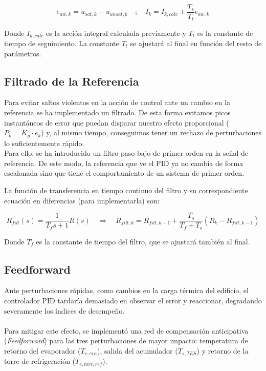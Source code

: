 	
	\begin{equation}
		e_{aw,k} = u_{sat,k} - u_{unsat,k} \quad ; \quad I_{k} = I_{k,calc} + \frac{T_s}{T_t} e_{aw,k}
	\end{equation}
	
	Donde $I_{k,calc}$ es la acción integral calculada previamente y $T_t$ es la constante de tiempo de seguimiento.  La constante $T_t$ se ajustará al final en función del resto de parámetros. 
	
	\subsection{Filtrado de la Referencia}
	
	Para evitar saltos violentos en la acción de control ante un cambio en la referencia se ha implementado un filtrado. De esta forma evitamos picos instantáneos de error que puedan disparar nuestro efecto proporcional ($P_k = K_p \cdot e_k$) y, al mismo tiempo, conseguimos tener un rechazo de perturbaciones lo suficientemente rápido. \\
	
Para ello, se ha introducido un filtro paso-bajo de primer orden en la señal de referencia. De este modo, la referencia que ve el PID ya no cambia de forma escalonada sino que tiene el comportamiento de un sistema de primer orden.  
	
	La función de transferencia en tiempo continuo del filtro y su correspondiente ecuación en diferencias (para implementarla) son:
	
	\begin{equation}
		R_{filt}(s) = \frac{1}{T_f s + 1} R(s) \quad \Longrightarrow \quad R_{filt,k} = R_{filt,k-1} + \frac{T_s}{T_f + T_s} \left( R_k - R_{filt,k-1} \right)
	\end{equation}
	
	Donde $T_f$ es la constante de tiempo del filtro, que se ajustará también al final.  
	
	\subsection{Feedforward}
	
	Ante perturbaciones rápidas, como cambios en la carga térmica del edificio, el controlador PID tardaría demasiado en observar el error y reaccionar, degradando severamente los índices de desempeño.\\\\
	 Para mitigar este efecto, se implementó una red de compensación anticipativa (\textit{Feedforward}) para las tres perturbaciones de mayor impacto: temperatura de retorno del evaporador ($T_{e,eva}$), salida del acumulador ($T_{s,TES}$) y retorno de la torre de refrigeración ($T_{e,torr,ref}$).\\
	
